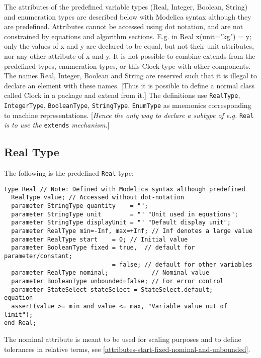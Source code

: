 The attributes of the predefined variable types (Real, Integer, Boolean,
String) and enumeration types are described below with Modelica syntax
although they are predefined. Attributes cannot be accessed using dot
notation, and are not constrained by equations and algorithm sections.
E.g. in Real x(unit="kg") = y; only the values of x and y are declared
to be equal, but not their unit attributes, nor any other attribute of x
and y. It is not possible to combine extends from the predefined types,
enumeration types, or this Clock type with other components. The names
Real, Integer, Boolean and String are reserved such that it is illegal
to declare an element with these names. {[}Thus it is possible to define
a normal class called Clock in a package and extend from it.{]} The
definitions use \lstinline!RealType!, \lstinline!IntegerType!,
\lstinline!BooleanType!, \lstinline!StringType!, \lstinline!EnumType!
as mnemonics corresponding to machine representations. {[}\emph{Hence
the only way to declare a subtype of e.g.} \lstinline!Real! \emph{is to use the}
\lstinline!extends! \emph{mechanism.}{]}

\subsection{Real Type}

The following is the predefined \lstinline!Real! type:

\begin{lstlisting}[language=modelica]
type Real // Note: Defined with Modelica syntax although predefined
  RealType value; // Accessed without dot-notation
  parameter StringType quantity    = "";
  parameter StringType unit        = "" "Unit used in equations";
  parameter StringType displayUnit = "" "Default display unit";
  parameter RealType min=-Inf, max=+Inf; // Inf denotes a large value
  parameter RealType start    = 0; // Initial value
  parameter BooleanType fixed = true,  // default for parameter/constant;
                              = false; // default for other variables
  parameter RealType nominal;            // Nominal value
  parameter BooleanType unbounded=false; // For error control
  parameter StateSelect stateSelect = StateSelect.default;
equation
  assert(value >= min and value <= max, "Variable value out of limit");
end Real;
\end{lstlisting}

The nominal attribute is meant to be used for scaling purposes and to
define tolerances in relative terms, see \autoref{attributes-start-fixed-nominal-and-unbounded}.

